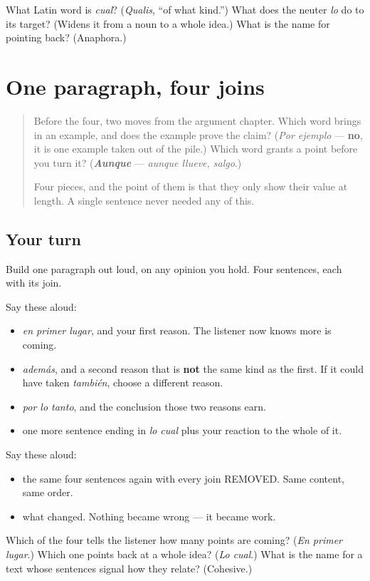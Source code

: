 \begin{tcolorbox}[breakable,colback=teal!4,colframe=teal!35!black,title={Before you move on}]
What Latin word is \emph{cual}? (\emph{Qualis}, \textquotedblleft{}of what kind.\textquotedblright{}) What does the neuter \emph{lo} do to its target? (Widens it from a noun to a whole idea.) What is the name for pointing back? (Anaphora.)
\end{tcolorbox}
\section[Practice]{One paragraph, four joins}

\label{lesson:ES-C273-practice}



\begin{quote}
Before the four, two moves from the argument chapter. Which word brings in an example, and does the example prove the claim? (\emph{Por ejemplo} — \textbf{no}, it is one example taken out of the pile.) Which word grants a point before you turn it? (\emph{\textbf{Aunque}} — \emph{aunque llueve, salgo}.)

Four pieces, and the point of them is that they only show their value at length. A single sentence never needed any of this.
\end{quote}

\subsection*{Your turn}
Build one paragraph out loud, on any opinion you hold. Four sentences, each with its join.

Say these aloud:

\begin{itemize}
\raggedright
  \item \emph{en primer lugar}, and your first reason. The listener now knows more is coming.
  \item \emph{además}, and a second reason that is \textbf{not} the same kind as the first. If it could have taken \emph{también}, choose a different reason.
  \item \emph{por lo tanto}, and the conclusion those two reasons earn.
  \item one more sentence ending in \emph{lo cual} plus your reaction to the whole of it.
\end{itemize}

Say these aloud:

\begin{itemize}
\raggedright
  \item the same four sentences again with every join REMOVED. Same content, same order.
  \item what changed. Nothing became wrong — it became work.
\end{itemize}

\begin{tcolorbox}[breakable,colback=teal!4,colframe=teal!35!black,title={Before you move on}]
Which of the four tells the listener how many points are coming? (\emph{En primer lugar}.) Which one points back at a whole idea? (\emph{Lo cual}.) What is the name for a text whose sentences signal how they relate? (Cohesive.)
\end{tcolorbox}
